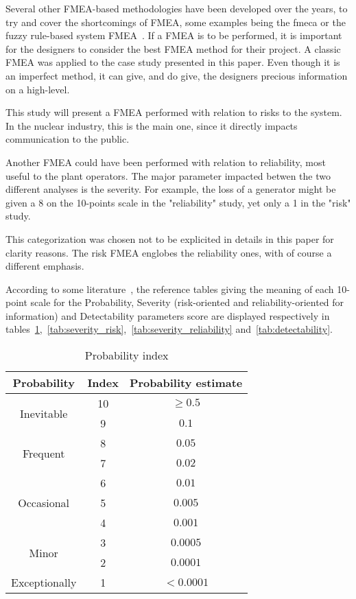 Several other FMEA-based methodologies have been developed over the years, to try and cover the shortcomings of FMEA, some examples being the \gls{fmeca} or the fuzzy rule-based system FMEA~\cite{bowles1995}. If a FMEA is to be performed, it is important for the designers to consider the best FMEA method for their project. A classic FMEA was applied to the case study presented in this paper. Even though it is an imperfect method, it can give, and do give, the designers precious information on a high-level.

This study will present a FMEA performed with relation to risks to the system. In the nuclear industry, this is the main one, since it directly impacts communication to the public.

Another FMEA could have been performed with relation to reliability, most useful to the plant operators. The major parameter impacted betwen the two different analyses is the severity. For example, the loss of a generator might be given a 8 on the 10-points scale in the "reliability" study, yet only a 1 in the "risk" study.

This categorization was chosen not to be explicited in details in this paper for clarity reasons. The risk FMEA englobes the reliability ones, with of course a different emphasis.

According to some literature~\cite{garcia2013}, the reference tables giving the meaning of each 10-point scale for the Probability, Severity (risk-oriented and reliability-oriented for information) and Detectability parameters score are displayed respectively in tables~\ref{tab:probability},~\ref{tab:severity_risk},~\ref{tab:severity_reliability} and~\ref{tab:detectability}.


\begin{table}[!htb]
    \centering
        \begin{tabular}{ ccc }
        \hline
        Probability & Index & Probability estimate \\ \hline\hline
        \multirow{2}{*}{Inevitable} & 10 & $\geq 0.5$\\
                                    & 9  & $0.1$ \\
        \multirow{2}{*}{Frequent}   & 8  & $0.05$\\
                                    & 7  & $0.02$ \\
        \multirow{3}{*}{Occasional}   & 6  & $0.01$\\
                                    & 5  & $0.005$ \\
                                    & 4  & $0.001$ \\
        \multirow{2}{*}{Minor}   & 3  & $0.0005$\\
                                    & 2  & $0.0001$ \\
        Exceptionally & 1  & $< 0.0001$ \\
                                     
        \end{tabular}
        \caption{Probability index}\label{tab:probability}
\end{table}

